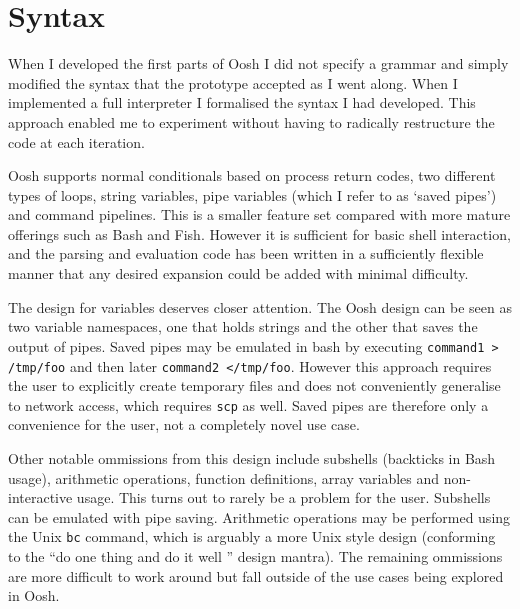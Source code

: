 \documentclass[12pt,twoside,notitlepage]{report}
\begin{document}
\section{Syntax}
When I developed the first parts of Oosh I did not specify a grammar and simply
modified the syntax that the prototype accepted as I went along. When I
implemented a full interpreter I formalised the syntax I had developed. This
approach enabled me to experiment without having to radically restructure the
code at each iteration.

Oosh supports normal conditionals based on process return codes, two
different types of loops, string variables, pipe variables (which I
refer to as `saved pipes') and command pipelines. This is a smaller
feature set compared with more mature offerings such as Bash and
Fish. However it is sufficient for basic shell interaction, and the
parsing and evaluation code has been written in a sufficiently
flexible manner that any desired expansion could be added with minimal
difficulty.

The design for variables deserves closer attention. The Oosh design
can be seen as two variable namespaces, one that holds strings and the
other that saves the output of pipes. Saved pipes may be emulated in
bash by executing {\tt command1 > /tmp/foo} and then later {\tt command2
  </tmp/foo}. However this approach requires the user to explicitly
create temporary files and does not conveniently generalise to network
access, which requires {\tt scp} as well. Saved pipes are therefore
only a convenience for the user, not a completely novel use case.

Other notable ommissions from this design include subshells (backticks
in Bash usage), arithmetic operations, function definitions, array
variables and non-interactive usage. This turns out to rarely be a
problem for the user. Subshells can be emulated with pipe
saving. Arithmetic operations may be performed using the Unix {\tt bc}
command, which is arguably a more Unix style design (conforming to the
``do one thing and do it well '' design mantra). The remaining
ommissions are more difficult to work around but fall outside of the
use cases being explored in Oosh.
\end{document}
